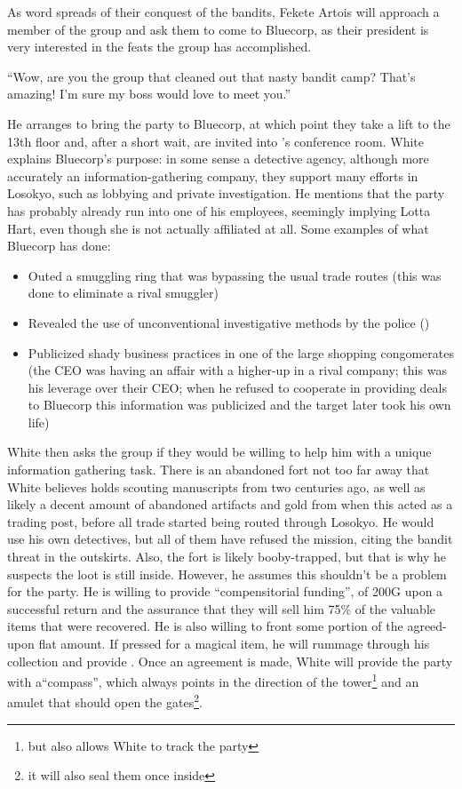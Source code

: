  As word spreads of their conquest of the bandits, Fekete Artois will approach a member of the group and ask them to come to Bluecorp, as their president is very interested in the feats the group has accomplished.\\
\begin{center}
``Wow, are you the group that cleaned out that nasty bandit camp? That's amazing! I'm sure my boss would love to meet you.''
\end{center}
He arranges to bring the party to Bluecorp, at which point they take a lift to the 13th floor and, after a short wait, are invited into 's conference room. White explains Bluecorp's purpose: in some sense a detective agency, although more accurately an information-gathering company, they support many efforts in Losokyo, such as lobbying and private investigation. He mentions that the party has probably already run into one of his employees, seemingly implying Lotta Hart, even though she is not actually affiliated at all. Some examples of what Bluecorp has done:
\begin{itemize}
\item Outed a smuggling ring that was bypassing the usual trade routes (this was done to eliminate a rival smuggler)
\item Revealed the use of unconventional investigative methods by the police ()
\item Publicized shady business practices in one of the large shopping congomerates (the CEO was having an affair with a higher-up in a rival company; this was his leverage over their CEO; when he refused to cooperate in providing deals to Bluecorp this information was publicized and the target later took his own life)
\end{itemize}
White then asks the group if they would be willing to help him with a unique information gathering task. There is an abandoned fort not too far away that White believes holds scouting manuscripts from two centuries ago, as well as likely a decent amount of abandoned artifacts and gold from when this acted as a trading post, before all trade started being routed through Losokyo. He would use his own detectives, but all of them have refused the mission, citing the bandit threat in the outskirts. Also, the fort is likely booby-trapped, but that is why he suspects the loot is still inside. However, he assumes this shouldn't be a problem for the party. He is willing to provide ``compensitorial funding'', of 200G upon a successful return and the assurance that they will sell him 75\% of the valuable items that were recovered. He is also willing to front some portion of the agreed-upon flat amount. If pressed for a magical item, he will rummage through his collection and provide . Once an agreement is made, White will provide the party with a``compass'', which always points in the direction of the tower\footnote{but also allows White to track the party} and an amulet that should open the gates\footnote{it will also seal them once inside}. \\
